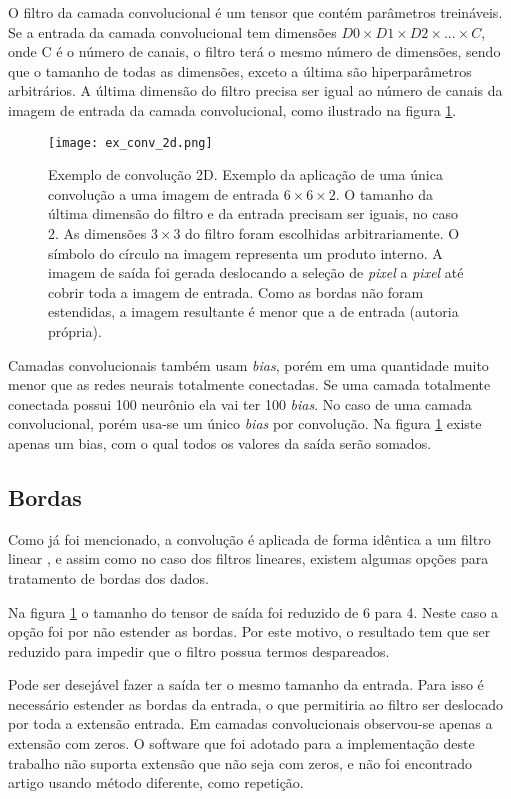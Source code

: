 O filtro da camada convolucional é um tensor que contém parâmetros treináveis.
Se a entrada da camada convolucional tem dimensões
$D0 \times D1 \times D2 \times ... \times C$, onde C é o número de canais,
o filtro terá o mesmo número de dimensões, sendo que o tamanho de todas
as dimensões, exceto a última são
hiperparâmetros arbitrários. A última dimensão do filtro precisa ser igual ao
número de canais da imagem de entrada da camada convolucional, como ilustrado na
figura \ref{fig:ex_conv_2d}.


\begin{figure}[!htb]
	\centering
	\texttt{[image: ex\_conv\_2d.png]}
	\caption[Exemplo de convolução 2D]{
		Exemplo de convolução 2D.
		Exemplo da aplicação de uma única convolução a uma imagem de
		entrada $6 \times 6 \times 2$. O tamanho da última dimensão do filtro e
		da entrada precisam ser iguais, no caso 2. As dimensões $3 \times 3$ do
		filtro foram escolhidas arbitrariamente. O símbolo do círculo na imagem
		representa um produto interno. A imagem de saída foi gerada deslocando
		a seleção de \emph{pixel} a \emph{pixel} até cobrir toda a
		imagem de entrada. Como as bordas não foram estendidas, a imagem
		resultante é menor que a de entrada (autoria própria).}
	\label{fig:ex_conv_2d}
\end{figure}

Camadas convolucionais também usam \emph{bias}, porém em uma quantidade muito
menor que as redes neurais totalmente conectadas. Se uma camada totalmente
conectada possui 100 neurônio ela vai ter 100 \emph{bias}. No caso de uma camada
convolucional, porém usa-se um único \emph{bias} por convolução. Na figura
\ref{fig:ex_conv_2d} existe apenas um bias, com o qual todos os valores da
saída serão somados.

\subsection{Bordas} \label{ses:bordas}
Como já foi mencionado, a convolução é aplicada de forma idêntica
a um filtro linear \cite{gonzalezwoods200708}, e assim como no caso dos
filtros lineares, existem algumas opções para tratamento de bordas dos dados.

Na figura \ref{fig:ex_conv_2d} o tamanho do tensor de saída foi reduzido
de 6 para 4. Neste caso a opção foi por não estender as bordas. Por
este motivo, o resultado tem que ser reduzido para impedir que o filtro
possua termos despareados.

Pode ser
desejável fazer a saída ter o mesmo tamanho da entrada. Para isso é necessário
estender as bordas da entrada, o que permitiria ao filtro ser deslocado por
toda a extensão entrada. Em camadas convolucionais observou-se apenas a
extensão com zeros. O software que foi adotado para a implementação deste
trabalho não suporta extensão que não seja com zeros, e não foi encontrado
artigo usando método diferente, como repetição.

